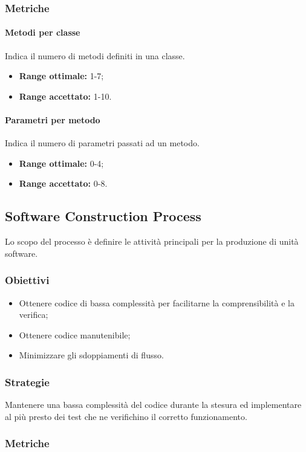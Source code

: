 		\subsubsection{Metriche}
			\paragraph{Metodi per classe} \Spazio
			Indica il numero di metodi definiti in una classe.
			\begin{itemize}
				\item \textbf{Range ottimale:} 1-7; 
				\item \textbf{Range accettato:} 1-10.
			\end{itemize}
			\paragraph{Parametri per metodo} \Spazio
			Indica il numero di parametri passati ad un metodo.
			\begin{itemize}
				\item \textbf{Range ottimale:} 0-4;
				\item \textbf{Range accettato:} 0-8.
			\end{itemize}
			
	\subsection{Software Construction Process}
	\label{sub:qdp2}
	Lo scopo del processo è definire le attività principali per la produzione di unità software.
		\subsubsection{Obiettivi}
		\begin{itemize}
			\item Ottenere codice di bassa complessità per facilitarne la comprensibilità e la verifica;
			\item Ottenere codice manutenibile;
			\item Minimizzare gli sdoppiamenti di flusso.
		\end{itemize}
		\subsubsection{Strategie}
		Mantenere una bassa complessità del codice durante la stesura ed implementare al più presto dei test che ne verifichino il corretto funzionamento.
		\subsubsection{Metriche}
